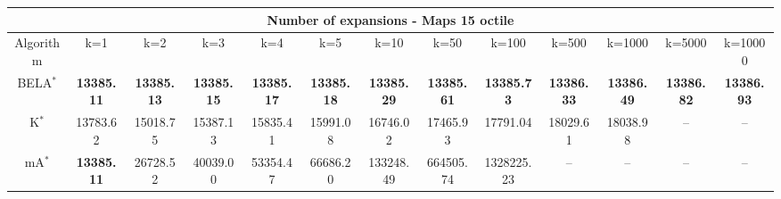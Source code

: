 \begin{tabular}{c|cccccccccccc}\toprule
\multicolumn{13}{c}{Number of expansions - Maps 15 octile}\\ \midrule
Algorithm & k=1 & k=2 & k=3 & k=4 & k=5 & k=10 & k=50 & k=100 & k=500 & k=1000 & k=5000 & k=10000 \\ \midrule
BELA$^*$ & \textbf{13385.11} & \textbf{13385.13} & \textbf{13385.15} & \textbf{13385.17} & \textbf{13385.18} & \textbf{13385.29} & \textbf{13385.61} & \textbf{13385.73} & \textbf{13386.33} & \textbf{13386.49} & \textbf{13386.82} & \textbf{13386.93} \\
K$^*$ & 13783.62 & 15018.75 & 15387.13 & 15835.41 & 15991.08 & 16746.02 & 17465.93 & 17791.04 & 18029.61 & 18038.98 & -- & -- \\
mA$^*$ & \textbf{13385.11} & 26728.52 & 40039.00 & 53354.47 & 66686.20 & 133248.49 & 664505.74 & 1328225.23 & -- & -- & -- & -- \\ \bottomrule 
\end{tabular}
